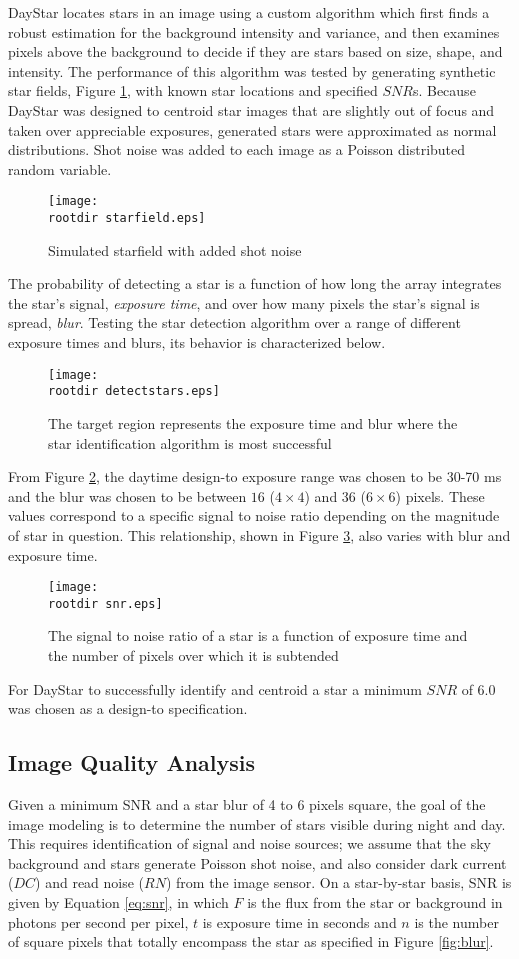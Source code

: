 \documentclass[twocolumn,letterpaper]{IEEEAerospace2012}
\newcommand{\rootdir}{./Figures/}
\newcommand{\RN}{\mathit{RN}}
\newcommand{\DC}{\mathit{DC}}
\begin{document}
DayStar locates stars in an image using a custom algorithm which first finds a robust estimation for the background intensity and variance, and then examines pixels above the background to decide if they are stars based on size, shape, and intensity. The performance of this algorithm was tested by generating synthetic star fields, Figure \ref{fig:starfield}, with known star locations and specified $SNR$s. Because DayStar was designed to centroid star images that are slightly out of focus and taken over appreciable exposures, generated stars were approximated as normal distributions. Shot noise was added to each image as a Poisson distributed random variable.
\begin{figure}[H]
    \label{fig:starfield}
    \texttt{[image: \\rootdir starfield.eps]}
    \caption{Simulated starfield with added shot noise}
\end{figure}
The probability of detecting a star is a function of how long the array integrates the star's signal, \textit{exposure time}, and over how many pixels the star's signal is spread, \textit{blur}. Testing the star detection algorithm over a range of different exposure times and blurs, its behavior is characterized below.
\begin{figure}[H]
    \label{fig:detectstars}
    \texttt{[image: \\rootdir detectstars.eps]}
    \caption{The target region represents the exposure time and blur where the star identification algorithm is most successful}
\end{figure}
From Figure \ref{fig:detectstars}, the daytime design-to exposure range was chosen to be 30-70 ms and the blur was chosen to be between $16$ ($4 \times 4$) and $36$ ($6 \times 6$) pixels. These values correspond to a specific signal to noise ratio depending on the magnitude of star in question. This relationship, shown in Figure \ref{fig:snr}, also varies with blur and exposure time.
\begin{figure}[H]
    \label{fig:snr}
    \texttt{[image: \\rootdir snr.eps]}
    \caption{The signal to noise ratio of a star is a function of exposure time and the number of pixels over which it is subtended}
\end{figure}

For DayStar to successfully identify and centroid a star a minimum $SNR$ of 6.0 was chosen as a design-to specification.


\subsection{Image Quality Analysis}
Given a minimum SNR and a star blur of 4 to 6 pixels square, the goal of the image modeling is to determine the number of stars visible during night and day. This requires identification of signal and noise sources; we assume that the sky background and stars generate Poisson shot noise, and also consider dark current ($\DC$) and read noise ($\RN$) from the image sensor. On a star-by-star basis, SNR is given by Equation \ref{eq:snr}, in which $F$ is the flux from the star or background in photons per second per pixel, $t$ is exposure time in seconds and $n$ is the number of square pixels that totally encompass the star as specified in Figure \ref{fig:blur}.
\end{document}

